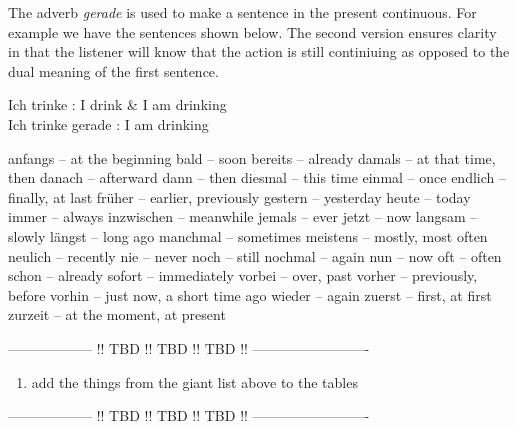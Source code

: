 \documentclass[a4paper,12pt]{article}
\begin{document}
\begin{adjustwidth}{2em}{0pt}
\begin{minipage}{0.45\textwidth}
\begin{tabular}{l|l}
\bottomrule
\end{tabular}
\vspace{0.3cm}
\newline
\end{minipage}

The adverb \textit{gerade} is used to make a sentence in the present continuous.
For example we have the sentences shown below. The second version ensures
clarity in that the listener will know that the action is still continiuing as
opposed to the dual meaning of the first sentence.

\vspace{0.25cm}

\noindent
Ich trinke        : I drink \& I am drinking \\
Ich trinke gerade : I am drinking

\vspace{0.25cm}

anfangs -- at the beginning
bald -- soon
bereits -- already
damals -- at that time, then
danach -- afterward
dann -- then
diesmal -- this time
einmal -- once
endlich -- finally, at last
früher -- earlier, previously
gestern -- yesterday
heute -- today
immer -- always
inzwischen -- meanwhile
jemals -- ever
jetzt -- now
langsam -- slowly
längst -- long ago
manchmal -- sometimes
meistens -- mostly, most often
neulich -- recently
nie -- never
noch -- still
nochmal -- again
nun -- now
oft -- often
schon -- already
sofort -- immediately
vorbei -- over, past
vorher -- previously, before
vorhin -- just now, a short time ago
wieder -- again
zuerst -- first, at first
zurzeit -- at the moment, at present


\begin{center}
\color{red}
------------------ !! TBD !! TBD !! TBD !! -------------------------

\begin{enumerate}[noitemsep]
	\item add the things from the giant list above to the tables 
\end{enumerate}

------------------ !! TBD !! TBD !! TBD !! -------------------------
\color{black}
\end{center}


\end{adjustwidth}

\end{document}
